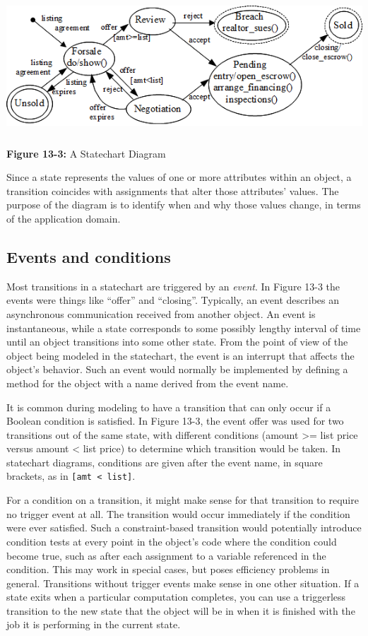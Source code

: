 \bigskip

\includegraphics[width=5.8in,height=2.0in]{ub-img/statechart.png}

{\sffamily\bfseries Figure 13-3:}
{\sffamily A Statechart Diagram}

\bigskip

Since a state represents the values of one or more attributes within an
object, a transition coincides with assignments that alter those
attributes' values. The purpose of the diagram is to
identify when and why those values change, in terms of the application
domain.

\subsection{Events and conditions}

Most transitions in a statechart are triggered by an \textit{event}. In Figure 13-3 the events were things like
``offer'' and ``closing''.  Typically, an event describes an asynchronous
communication received from another object. An event is instantaneous, while a
state corresponds to some possibly lengthy interval of time until an object
transitions into some other state.  From the point of view of the object being
modeled in the statechart, the event is an interrupt that affects the object's
behavior. Such an event would normally be implemented by defining a method for
the object with a name derived from the event name.

It is common during modeling to have a transition that can only occur if a
Boolean condition is satisfied. In Figure 13-3, the event offer was used for
two transitions out of the same state, with different conditions (amount
{\textgreater}= list price versus amount {\textless} list price) to determine
which transition would be taken. In statechart diagrams, conditions are given
after the event name, in square brackets, as in
\texttt{[amt {\textless} list]}.

For a condition on a transition, it might make sense for that
transition to require no trigger event at all. The transition would
occur immediately if the condition were ever satisfied. Such a
constraint-based transition would potentially introduce condition tests
at every point in the object's code where the
condition could become true, such as after each assignment to a
variable referenced in the condition. This may work in special
cases, but poses efficiency problems in general. Transitions without
trigger events make sense in one other situation. If a state exits when
a particular computation completes, you can use a triggerless
transition to the new state that the object will be in when it is
finished with the job it is performing in the current state.

